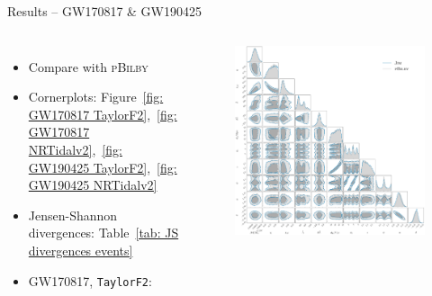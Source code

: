 \documentclass[usenames,dvipsnames,t]{beamer}
\begin{document}
\begin{frame}{Results -- GW170817 \& GW190425}

    \def\x{3mm}

    \begin{columns}
      \begin{itemize}
        \item Compare with \textsc{pBilby}

        \vspace{\x}
        
        \item Cornerplots: Figure~\ref{fig: GW170817 TaylorF2},~\ref{fig: GW170817 NRTidalv2},~\ref{fig: GW190425 TaylorF2},~\ref{fig: GW190425 NRTidalv2}

        \vspace{\x}
  
        \item Jensen-Shannon divergences: Table~\ref{tab: JS divergences events}
        
        \vspace{\x}
        \item GW170817, \texttt{TaylorF2}:
      \end{itemize}


    \vspace{-15.5mm}
    \begin{figure}
    \includegraphics[scale = 0.132]{Figures/GW170817_TaylorF2.pdf}
    \caption*{}
    \end{figure}
    \end{columns}
    
  
\end{frame}
\end{document}
